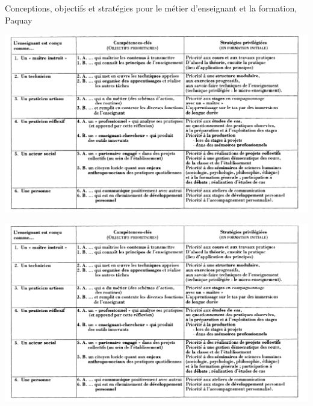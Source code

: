                 \begin{table}
                \centering
                \caption[le métier d'enseignant et la formation, Paquay~]{Conceptions, objectifs et stratégies pour le métier d'enseignant et la formation, Paquay~}
                \label{tab:ref_prof}
                \begin{minipage}{0.95\linewidth}
                    \centering
                    \includegraphics[width=\linewidth]{Figures/paquay-ref_con_prof.png}
                    \label{tab:ref_con_prof}
                \end{minipage}
                \begin{minipage}{0.95\linewidth}
                    \centering
                    \includegraphics[width=\linewidth]{Figures/paquay-ref_con_prof.png}
                    \label{tab:ref_obj_prof}
                \end{minipage}
                \end{table}
